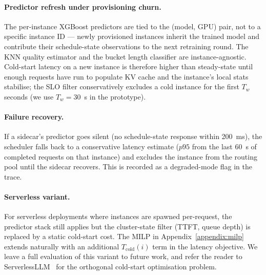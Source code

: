 \documentclass[10pt]{article}
\begin{document}
\paragraph{Predictor refresh under provisioning churn.}
The per-instance XGBoost predictors are tied to the (model, GPU) pair, not to a specific instance ID — newly provisioned instances inherit the trained model and contribute their schedule-state observations to the next retraining round. The KNN quality estimator and the bucket length classifier are instance-agnostic. Cold-start latency on a new instance is therefore higher than steady-state until enough requests have run to populate KV cache and the instance's local stats stabilise; the SLO filter conservatively excludes a cold instance for the first $T_w$ seconds (we use $T_w = 30$~s in the prototype).

\paragraph{Failure recovery.}
If a sidecar's predictor goes silent (no schedule-state response within 200~ms), the scheduler falls back to a conservative latency estimate ($p95$ from the last 60~s of completed requests on that instance) and excludes the instance from the routing pool until the sidecar recovers. This is recorded as a degraded-mode flag in the trace.

\paragraph{Serverless variant.}
For serverless deployments where instances are spawned per-request, the predictor stack still applies but the cluster-state filter (TTFT, queue depth) is replaced by a static cold-start cost. The MILP in Appendix~\ref{appendix:milp} extends naturally with an additional $T_{\text{cold}}(i)$ term in the latency objective. We leave a full evaluation of this variant to future work, and refer the reader to ServerlessLLM~\cite{splitwise} for the orthogonal cold-start optimisation problem.
\end{document}
